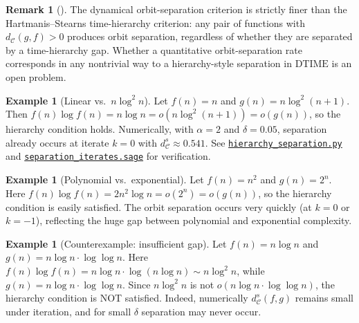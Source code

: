 \documentclass[11pt,a4paper]{article}
\newcommand{\repourl}{https://github.com/gabayae/expansive-homeomorphisms-complexity-qmetric}
\theoremstyle{plain}
\theoremstyle{definition}
\newtheorem{exampleinner}[theoreminner]{Example}
\newtheorem{remarkinner}[theoreminner]{Remark}
\newenvironment{example}[1][]{\begin{exampleinner}[#1]}{\end{exampleinner}}
\newenvironment{remark}[1][]{\begin{remarkinner}[#1]}{\end{remarkinner}}
\newcommand{\C}{\mathcal{C}}
\begin{document}
\begin{remark}\label{rem:hierarchy}
The dynamical orbit-separation criterion is strictly finer than the
Hartmanis--Stearns time-hierarchy criterion: any pair of functions
with $d_\C(g,f)>0$ produces orbit separation, regardless of whether
they are separated by a time-hierarchy gap.  Whether a quantitative
orbit-separation rate corresponds in any nontrivial way to a
hierarchy-style separation in $\mathrm{DTIME}$ is an open problem.
\end{remark}

\begin{example}[Linear vs.\ $n\log^2 n$]\label{ex:hier-nlogn}
Let $f(n)=n$ and $g(n)=n\log^2(n+1)$.  Then
$f(n)\log f(n)=n\log n=o(n\log^2(n+1))=o(g(n))$, so the hierarchy
condition holds.  Numerically, with $\alpha=2$ and $\delta=0.05$,
separation already occurs at iterate $k=0$ with
$d_\C^s\approx 0.541$.  See
\href{\repourl/blob/main/code/python/hierarchy_separation.py}{\texttt{hierarchy\_separation.py}} and
\href{\repourl/blob/main/code/sagemath/separation_iterates.sage}{\texttt{separation\_iterates.sage}}
for verification.
\end{example}

\begin{example}[Polynomial vs.\ exponential]\label{ex:hier-poly-exp}
Let $f(n)=n^2$ and $g(n)=2^n$.  Here $f(n)\log f(n)=2n^2\log n
=o(2^n)=o(g(n))$, so the hierarchy condition is easily satisfied.
The orbit separation occurs very quickly (at $k=0$ or $k=-1$),
reflecting the huge gap between polynomial and exponential complexity.
\end{example}

\begin{example}[Counterexample: insufficient gap]\label{ex:counter-hierarchy}
Let $f(n)=n\log n$ and $g(n)=n\log n \cdot \log\log n$. 
Here $f(n)\log f(n) = n\log n \cdot \log(n\log n) \sim n\log^2 n$,
while $g(n) = n\log n \cdot \log\log n$. 
Since $n\log^2 n$ is not $o(n\log n \cdot \log\log n)$, 
the hierarchy condition is NOT satisfied. Indeed, numerically
$d_\C^s(f,g)$ remains small under iteration, and for small $\delta$
separation may never occur.
\end{example}
\end{document}
